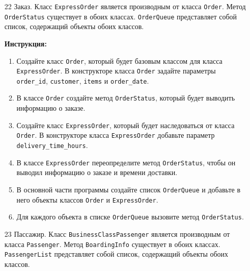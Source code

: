 \begin{enumerate}
\item[22]
Заказ. Класс \texttt{ExpressOrder} является производным от класса \texttt{Order}. Метод \texttt{OrderStatus} существует в обоих классах. \texttt{OrderQueue} представляет собой список, содержащий объекты обоих классов.

\textbf{Инструкция:}
\begin{enumerate}
    \item Создайте класс \texttt{Order}, который будет базовым классом для класса \texttt{ExpressOrder}. В конструкторе класса \texttt{Order} задайте параметры \texttt{order\_id}, \texttt{customer}, \texttt{items} и \texttt{order\_date}.
    \item В классе \texttt{Order} создайте метод \texttt{OrderStatus}, который будет выводить информацию о заказе.
    \item Создайте класс \texttt{ExpressOrder}, который будет наследоваться от класса \texttt{Order}. В конструкторе класса \texttt{ExpressOrder} добавьте параметр \texttt{delivery\_time\_hours}.
    \item В классе \texttt{ExpressOrder} переопределите метод \texttt{OrderStatus}, чтобы он выводил информацию о заказе и времени доставки.
    \item В основной части программы создайте список \texttt{OrderQueue} и добавьте в него объекты классов \texttt{Order} и \texttt{ExpressOrder}.
    \item Для каждого объекта в списке \texttt{OrderQueue} вызовите метод \texttt{OrderStatus}.
\end{enumerate}

\item[23]
Пассажир. Класс \texttt{BusinessClassPassenger} является производным от класса \texttt{Passenger}. Метод \texttt{BoardingInfo} существует в обоих классах. \texttt{PassengerList} представляет собой список, содержащий объекты обоих классов.


\end{enumerate}
